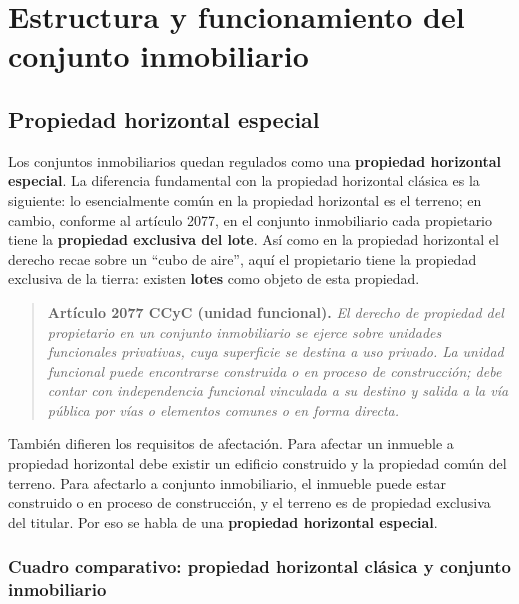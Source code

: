 \documentclass[12pt,oneside]{book}
\begin{document}
\chapter[Estructura y funcionamiento]{Estructura y funcionamiento del conjunto inmobiliario}

\section{Propiedad horizontal especial}

Los conjuntos inmobiliarios quedan regulados como una \textbf{propiedad horizontal especial}. La diferencia fundamental con la propiedad horizontal clásica es la siguiente: lo esencialmente común en la propiedad horizontal es el terreno; en cambio, conforme al artículo 2077, en el conjunto inmobiliario cada propietario tiene la \textbf{propiedad exclusiva del lote}. Así como en la propiedad horizontal el derecho recae sobre un ``cubo de aire'', aquí el propietario tiene la propiedad exclusiva de la tierra: existen \textbf{lotes} como objeto de esta propiedad.

\begin{quote}
\textbf{Artículo 2077 CCyC (unidad funcional).} \textit{El derecho de propiedad del propietario en un conjunto inmobiliario se ejerce sobre unidades funcionales privativas, cuya superficie se destina a uso privado. La unidad funcional puede encontrarse construida o en proceso de construcción; debe contar con independencia funcional vinculada a su destino y salida a la vía pública por vías o elementos comunes o en forma directa.}
\end{quote}

También difieren los requisitos de afectación. Para afectar un inmueble a propiedad horizontal debe existir un edificio construido y la propiedad común del terreno. Para afectarlo a conjunto inmobiliario, el inmueble puede estar construido o en proceso de construcción, y el terreno es de propiedad exclusiva del titular. Por eso se habla de una \textbf{propiedad horizontal especial}.

\subsection{Cuadro comparativo: propiedad horizontal clásica y conjunto inmobiliario}
\end{document}
